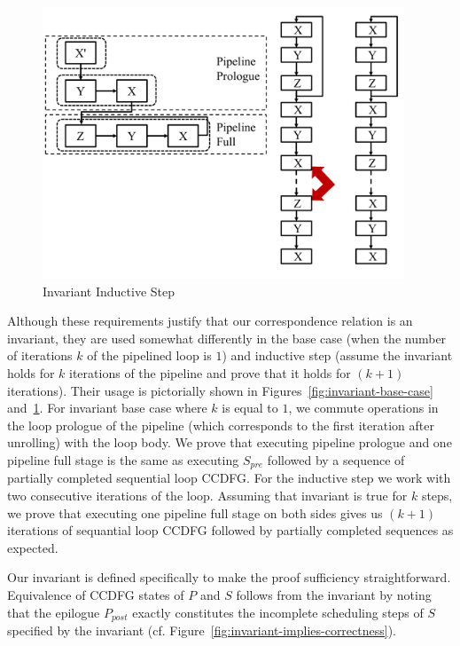 \begin{figure}[t!]
\begin{center}
\includegraphics[width=4.25in]{fig-proposal/invariant-inductive-step}
\end{center}
\caption{Invariant Inductive Step}
\label{fig:invariant-inductive-step}
\end{figure}

Although these requirements justify that our correspondence
relation is an invariant, they are used somewhat differently
in the base case (when the number of iterations $k$ of the
pipelined loop is $1$) and inductive step (assume the
invariant holds for $k$ iterations of the pipeline and prove
that it holds for $(k+ 1)$ iterations).  Their usage is
pictorially shown in Figures~\ref{fig:invariant-base-case}
and~\ref{fig:invariant-inductive-step}. For invariant base case where $k$ is
equal to $1$, we commute operations in the loop prologue of
the pipeline (which corresponds to the first iteration after
unrolling) with the loop body. We prove that executing
  pipeline prologue and one pipeline full stage is the same
  as executing $S_{pre}$ followed by a sequence of partially
  completed sequential loop CCDFG. For the inductive step
we work with two consecutive iterations of the loop. Assuming that
  invariant is true for $k$ steps, we prove that executing one pipeline full
  stage on both sides gives us $(k + 1)$ iterations of
  sequantial loop CCDFG followed by partially completed
  sequences as expected.

Our invariant is defined specifically to make the proof
sufficiency straightforward.
Equivalence of CCDFG states of $P$ and $S$ follows from the
invariant by noting that the epilogue $P_{post}$ exactly
constitutes the incomplete scheduling steps of $S$ specified
by the invariant
(cf. Figure~\ref{fig:invariant-implies-correctness}).

